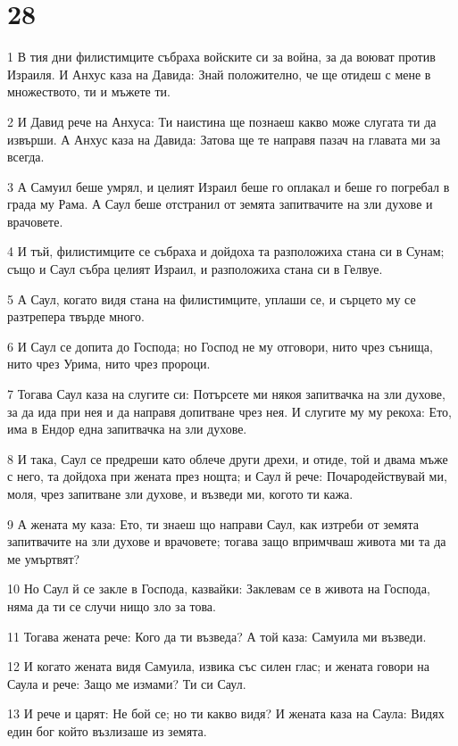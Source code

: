 \chapter{28}

\par 1 В тия дни филистимците събраха войските си за война, за да воюват против Израиля. И Анхус каза на Давида: Знай положително, че ще отидеш с мене в множеството, ти и мъжете ти.
\par 2 И Давид рече на Анхуса: Ти наистина ще познаеш какво може слугата ти да извърши. А Анхус каза на Давида: Затова ще те направя пазач на главата ми за всегда.
\par 3 А Самуил беше умрял, и целият Израил беше го оплакал и беше го погребал в града му Рама. А Саул беше отстранил от земята запитвачите на зли духове и врачовете.
\par 4 И тъй, филистимците се събраха и дойдоха та разположиха стана си в Сунам; също и Саул събра целият Израил, и разположиха стана си в Гелвуе.
\par 5 А Саул, когато видя стана на филистимците, уплаши се, и сърцето му се разтрепера твърде много.
\par 6 И Саул се допита до Господа; но Господ не му отговори, нито чрез сънища, нито чрез Урима, нито чрез пророци.
\par 7 Тогава Саул каза на слугите си: Потърсете ми някоя запитвачка на зли духове, за да ида при нея и да направя допитване чрез нея. И слугите му му рекоха: Ето, има в Ендор една запитвачка на зли духове.
\par 8 И така, Саул се предреши като облече други дрехи, и отиде, той и двама мъже с него, та дойдоха при жената през нощта; и Саул й рече: Почародействувай ми, моля, чрез запитване зли духове, и възведи ми, когото ти кажа.
\par 9 А жената му каза: Ето, ти знаеш що направи Саул, как изтреби от земята запитвачите на зли духове и врачовете; тогава защо впримчваш живота ми та да ме умъртвят?
\par 10 Но Саул й се закле в Господа, казвайки: Заклевам се в живота на Господа, няма да ти се случи нищо зло за това.
\par 11 Тогава жената рече: Кого да ти възведа? А той каза: Самуила ми възведи.
\par 12 И когато жената видя Самуила, извика със силен глас; и жената говори на Саула и рече: Защо ме измами? Ти си Саул.
\par 13 И рече и царят: Не бой се; но ти какво видя? И жената каза на Саула: Видях един бог който възлизаше из земята.
